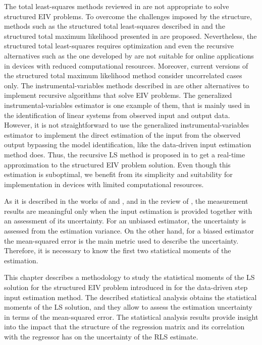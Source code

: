 \color{blue} 
The total least-squares methods reviewed in \citet{Markovsky07overview} are not appropriate to solve structured EIV problems.
To overcome the challenges imposed by the structure, methods such as the structured total least-squares described in \citet{Lemmerling02} and the structured total maximum likelihood presented in \citet{Beck10} are proposed.
Nevertheless, the structured total least-squares requires optimization and even the recursive alternatives such as the one developed by \citet{Rhode14recursive} are not suitable for online applications in devices with reduced computational resources.
Moreover, current versions of the structured total maximum likelihood method consider uncorrelated cases only. 
The instrumental-variables methods described in \citet{Soderstrom18} are other alternatives to implement recursive algorithms that solve EIV problems.
The generalized instrumental-variables estimator is one example of them, that is mainly used in the identification of linear systems from observed input and output data.
However, it is not straightforward to use the generalized instrumental-variables estimator to implement the direct estimation of the input from the observed output bypassing the model identification, like the data-driven input estimation method does. 
Thus, the recursive LS method is proposed in \citet{Markovsky15cep} to get a real-time approximation to the structured EIV problem solution.
Even though this estimation is suboptimal, we benefit from its simplicity and suitability for implementation in devices with limited computational resources.

As it is described in the works of \citet{Ferrero06} and \citet{Hessling13b}, and in the review of \citet{daSilva12}, the measurement results are meaningful only when the input estimation is provided together with an assessment of its uncertainty.
For an unbiased estimator, the uncertainty is assessed from the estimation variance.
On the other hand, for a biased estimator the mean-squared error is the main metric used to describe the uncertainty.
Therefore, it is necessary to know the first two statistical moments of the estimation.

This chapter describes a methodology to study the statistical moments of the LS solution for the structured EIV problem introduced in \citet{Markovsky15cep, Markovsky15ieee} for the data-driven step input estimation method.
The described statistical analysis obtains the statistical moments of the LS solution, and they allow to assess the estimation uncertainty in terms of the mean-squared error.
The statistical analysis results provide insight into the impact that the structure of the regression matrix and its correlation with the regressor has on the uncertainty of the RLS estimate.

